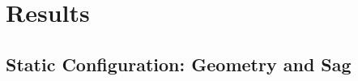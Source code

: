 %

\newcommand{\figplaceholder}[2][0.85\textwidth]{%
  \fbox{\parbox[c][0.35\textwidth][c]{#1}{\centering\ttfamily #2}}}

\section{Results}
\label{sec:results}


\subsection{Static Configuration: Geometry and Sag}
\label{sec:res:static}

